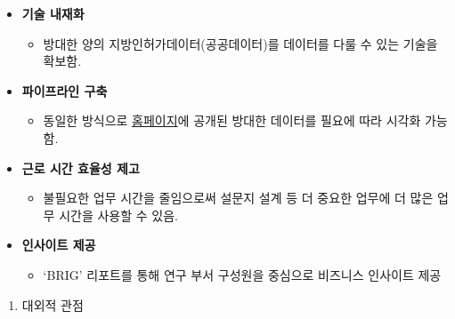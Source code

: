 \documentclass[
]{book}
\providecommand{\tightlist}{%
  \setlength{\itemsep}{0pt}\setlength{\parskip}{0pt}}
\begin{document}
\begin{itemize}
\item
  \textbf{기술 내재화}

  \begin{itemize}
  \tightlist
  \item
    방대한 양의 지방인허가데이터(공공데이터)를 데이터를 다룰 수 있는 기술을 확보함.
  \end{itemize}
\item
  \textbf{파이프라인 구축}

  \begin{itemize}
  \tightlist
  \item
    동일한 방식으로 \href{https://www.localdata.go.kr/}{홈페이지}에 공개된 방대한 데이터를 필요에 따라 시각화 가능함.
  \end{itemize}
\item
  \textbf{근로 시간 효율성 제고}

  \begin{itemize}
  \tightlist
  \item
    불필요한 업무 시간을 줄임으로써 설문지 설계 등 더 중요한 업무에 더 많은 업무 시간을 사용할 수 있음.
  \end{itemize}
\item
  \textbf{인사이트 제공}

  \begin{itemize}
  \tightlist
  \item
    `BRIG' 리포트를 통해 연구 부서 구성원을 중심으로 비즈니스 인사이트 제공
  \end{itemize}
\end{itemize}

\begin{enumerate}
\def\labelenumi{\arabic{enumi}.}
\setcounter{enumi}{2}
\tightlist
\item
  대외적 관점
\end{enumerate}
\end{document}
